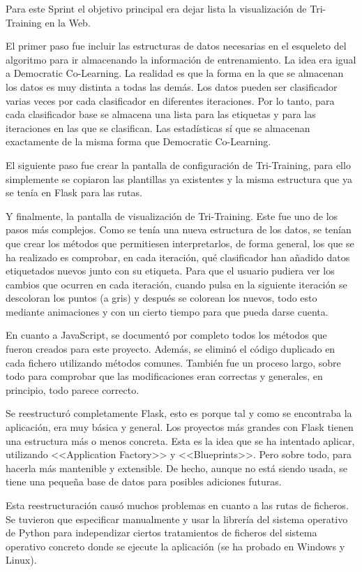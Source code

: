 Para este Sprint el objetivo principal era dejar lista la visualización de
Tri-Training en la Web. 

El primer paso fue incluir las estructuras de datos necesarias en el esqueleto
del algoritmo para ir almacenando la información de entrenamiento. La idea era
igual a Democratic Co-Learning. La realidad es que la forma en la que se
almacenan los datos es muy distinta a todas las demás. Los datos pueden ser
clasificador varias veces por cada clasificador en diferentes iteraciones. Por
lo tanto, para cada clasificador base se almacena una lista para las etiquetas y
para las iteraciones en las que se clasifican. Las estadísticas sí que se
almacenan exactamente de la misma forma que Democratic Co-Learning.

El siguiente paso fue crear la pantalla de configuración de Tri-Training, para
ello simplemente se copiaron las plantillas ya existentes y la misma estructura
que ya se tenía en Flask para las rutas.

Y finalmente, la pantalla de visualización de Tri-Training. Este fue uno de los
pasos más complejos. Como se tenía una nueva estructura de los datos, se tenían
que crear los métodos que permitiesen interpretarlos, de forma general, los que
se ha realizado es comprobar, en cada iteración, qué clasificador han añadido
datos etiquetados nuevos junto con su etiqueta. Para que el usuario pudiera ver
los cambios que ocurren en cada iteración, cuando pulsa en la siguiente
iteración se descoloran los puntos (a gris) y después se colorean los nuevos,
todo esto mediante animaciones y con un cierto tiempo para que pueda darse
cuenta.

En cuanto a JavaScript, se documentó por completo todos los métodos que fueron
creados para este proyecto. Además, se eliminó el código duplicado en cada
fichero utilizando métodos comunes. También fue un proceso largo, sobre todo para
comprobar que las modificaciones eran correctas y generales, en principio, todo
parece correcto.

Se reestructuró completamente Flask, esto es porque tal y como se encontraba la
aplicación, era muy básica y general. Los proyectos más grandes con Flask tienen
una estructura más o menos concreta. Esta es la idea que se ha intentado
aplicar, utilizando <<Application Factory>> y <<Blueprints>>. Pero sobre todo,
para hacerla más mantenible y extensible. De hecho, aunque no está siendo usada,
se tiene una pequeña base de datos para posibles adiciones futuras. 

Esta reestructuración causó muchos problemas en cuanto a las rutas de ficheros.
Se tuvieron que especificar manualmente y usar la librería del sistema operativo
de Python para independizar ciertos tratamientos de ficheros del sistema
operativo concreto donde se ejecute la aplicación (se ha probado en Windows y
Linux).

